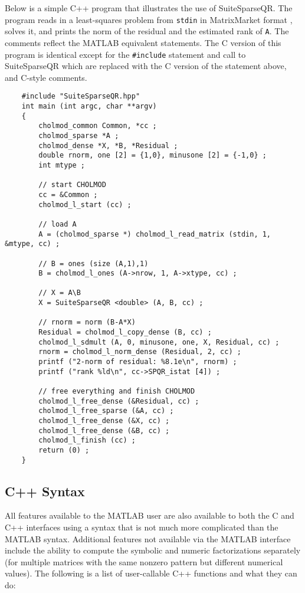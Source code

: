 \documentclass[12pt]{article}
\begin{document}
Below is a simple C++ program that illustrates the use of SuiteSparseQR.  The
program reads in a least-squares problem from \verb'stdin' in MatrixMarket
format \cite{BoisvertPozoRemingtonBarrettDongarra97}, solves it, and prints the
norm of the residual and the estimated rank of \verb'A'.  The comments reflect
the MATLAB equivalent statements.  The C version of this program is identical
except for the \verb'#include' statement and call to SuiteSparseQR which are
replaced with the C version of the statement above, and C-style comments.

{\footnotesize
\begin{verbatim}
    #include "SuiteSparseQR.hpp"
    int main (int argc, char **argv)
    {
        cholmod_common Common, *cc ;
        cholmod_sparse *A ;
        cholmod_dense *X, *B, *Residual ;
        double rnorm, one [2] = {1,0}, minusone [2] = {-1,0} ;
        int mtype ;

        // start CHOLMOD
        cc = &Common ;
        cholmod_l_start (cc) ;

        // load A
        A = (cholmod_sparse *) cholmod_l_read_matrix (stdin, 1, &mtype, cc) ;

        // B = ones (size (A,1),1)
        B = cholmod_l_ones (A->nrow, 1, A->xtype, cc) ;

        // X = A\B
        X = SuiteSparseQR <double> (A, B, cc) ;

        // rnorm = norm (B-A*X)
        Residual = cholmod_l_copy_dense (B, cc) ;
        cholmod_l_sdmult (A, 0, minusone, one, X, Residual, cc) ;
        rnorm = cholmod_l_norm_dense (Residual, 2, cc) ;
        printf ("2-norm of residual: %8.1e\n", rnorm) ;
        printf ("rank %ld\n", cc->SPQR_istat [4]) ;

        // free everything and finish CHOLMOD
        cholmod_l_free_dense (&Residual, cc) ;
        cholmod_l_free_sparse (&A, cc) ;
        cholmod_l_free_dense (&X, cc) ;
        cholmod_l_free_dense (&B, cc) ;
        cholmod_l_finish (cc) ;
        return (0) ;
    }
\end{verbatim}
}

\subsection{C++ Syntax}

All features available to the MATLAB user are also available to both the C and
C++ interfaces using a syntax that is not much more complicated than the MATLAB
syntax.  Additional features not available via the MATLAB interface include the
ability to compute the symbolic and numeric factorizations separately (for
multiple matrices with the same nonzero pattern but different numerical
values).  The following is a list of user-callable C++ functions and what they
can do:
\end{document}
